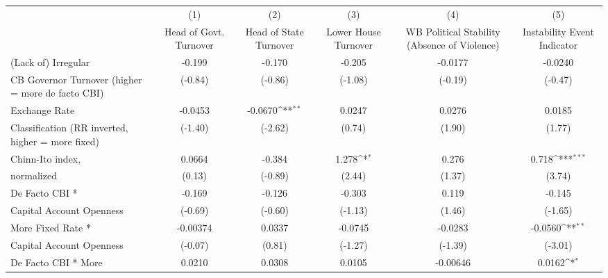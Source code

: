 {
\def\sym#1{\ifmmode^{#1}\else\(^{#1}\)\fi}
\begin{tabular}{l*{5}{c}}
\hline\hline
                    &\multicolumn{1}{c}{(1)}&\multicolumn{1}{c}{(2)}&\multicolumn{1}{c}{(3)}&\multicolumn{1}{c}{(4)}&\multicolumn{1}{c}{(5)}\\
                    &\multicolumn{1}{c}{Head of Govt. Turnover}&\multicolumn{1}{c}{Head of State Turnover}&\multicolumn{1}{c}{Lower House Turnover}&\multicolumn{1}{c}{WB Political Stability (Absence of Violence)}&\multicolumn{1}{c}{Instability Event Indicator}\\
\hline
(Lack of) Irregular &      -0.199         &      -0.170         &      -0.205         &     -0.0177         &     -0.0240         \\
CB Governor Turnover (higher = more de facto CBI)&     (-0.84)         &     (-0.86)         &     (-1.08)         &     (-0.19)         &     (-0.47)         \\
[1em]
Exchange Rate       &     -0.0453         &     -0.0670\sym{**} &      0.0247         &      0.0276         &      0.0185         \\
Classification (RR inverted, higher = more fixed)&     (-1.40)         &     (-2.62)         &      (0.74)         &      (1.90)         &      (1.77)         \\
[1em]
Chinn-Ito index,    &      0.0664         &      -0.384         &       1.278\sym{*}  &       0.276         &       0.718\sym{***}\\
normalized          &      (0.13)         &     (-0.89)         &      (2.44)         &      (1.37)         &      (3.74)         \\
[1em]
De Facto CBI *      &      -0.169         &      -0.126         &      -0.303         &       0.119         &      -0.145         \\
Capital Account Openness&     (-0.69)         &     (-0.60)         &     (-1.13)         &      (1.46)         &     (-1.65)         \\
[1em]
More Fixed Rate *   &    -0.00374         &      0.0337         &     -0.0745         &     -0.0283         &     -0.0560\sym{**} \\
Capital Account Openness&     (-0.07)         &      (0.81)         &     (-1.27)         &     (-1.39)         &     (-3.01)         \\
[1em]
De Facto CBI * More &      0.0210         &      0.0308         &      0.0105         &    -0.00646         &      0.0162\sym{*}  \\

\end{tabular}}
